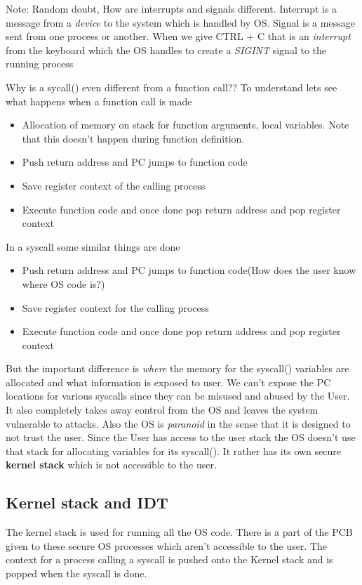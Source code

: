 \documentclass[12pt]{article}
\begin{document}
Note: Random doubt, How are interrupts and signals different. Interrupt is a message from a \textit{device} to the system which is handled by OS.
Signal is a message sent from one process or another. When we give CTRL + C that is an \textit{interrupt} from the keyboard which the OS handles to create a \textit{SIGINT} signal to the running process

Why is a sycall() even different from a function call??
To understand lets see what happens when a function call is made
\begin{itemize}[topsep=0pt, partopsep=0pt, itemsep=0pt, parsep=0pt]
    \item Allocation of memory on stack for function arguments, local variables. Note that this doesn't happen during function definition.
    \item Push return address and PC jumps to function code
    \item Save register context of the calling process
    \item Execute function code and once done pop return address and pop register context
\end{itemize}

In a syscall some similar things are done
\begin{itemize}[topsep=0pt, partopsep=0pt, itemsep=0pt, parsep=0pt]
    \item Push return address and PC jumps to function code(How does the user know where OS code is?)
    \item Save register context for the calling process
    \item Execute function code and once done pop return address and pop register context
\end{itemize}

But the important difference is \textit{where} the memory for the syscall() variables are allocated and what information is exposed to user.
We can't expose the PC locations for various syscalls since they can be misused and abused by the User. It also completely takes away control from the OS and leaves the system vulnerable to attacks.
Also the OS is \textit{paranoid} in the sense that it is designed to not trust the user. Since the User has access to the user stack the OS doesn't use that stack
for allocating variables for its syscall(). It rather has its own secure \textbf{kernel stack} which is not accessible to the user.

\subsection{Kernel stack and IDT}
The kernel stack is used for running all the OS code. There is a part of the PCB given to these secure OS processes which aren't accessible to the user.
The context for a process calling a syscall is pushed onto the Kernel stack and is popped when the syscall is done.
\end{document}
